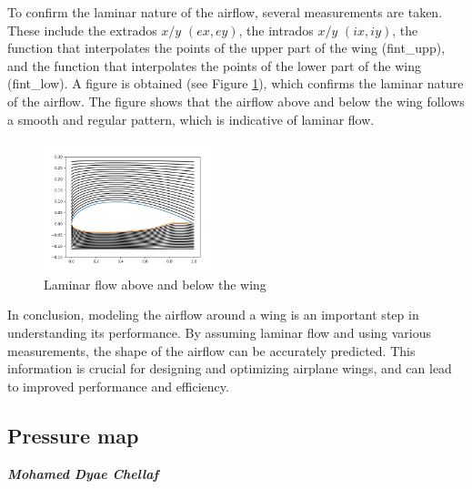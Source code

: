 To confirm the laminar nature of the airflow, several measurements are taken. These include the extrados $x/y$ $(ex, ey)$, the intrados $x/y$ $(ix, iy)$, the function that interpolates the points of the upper part of the wing (fint\_upp), and the function that interpolates the points of the lower part of the wing (fint\_low). A figure is obtained (see Figure \ref{fig:laminar}), which confirms the laminar nature of the airflow. The figure shows that the airflow above and below the wing follows a smooth and regular pattern, which is indicative of laminar flow.
\begin{figure}[H]
  \centering
  \includegraphics[width=0.45\textwidth]{img/laminar_flow.png}
  \caption{Laminar flow above and below the wing}
  \label{fig:laminar}
\end{figure}

In conclusion, modeling the airflow around a wing is an important step in understanding its performance. By assuming laminar flow and using various measurements, the shape of the airflow can be accurately predicted. This information is crucial for designing and optimizing airplane wings, and can lead to improved performance and efficiency.

\subsection{Pressure map}
\large \emph{\textbf{Mohamed Dyae Chellaf}}

